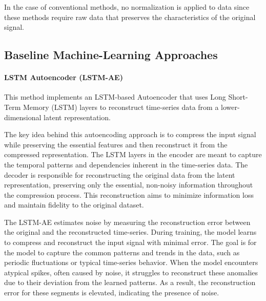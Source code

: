 \documentclass[conference]{IEEEtran}
\begin{document}


In the case of conventional methods, no normalization is applied to data since these methods require raw data that preserves the characteristics of the original signal.


\subsection{Baseline Machine-Learning Approaches}

\paragraph{LSTM Autoencoder (LSTM-AE)}
This method implements an LSTM-based Autoencoder that uses Long Short-Term Memory (LSTM) layers to reconstruct time-series data from a lower-dimensional latent representation. 

The key idea behind this autoencoding approach is to compress the input signal while preserving the essential features and then reconstruct it from the compressed representation. The LSTM layers in the encoder are meant to capture the temporal patterns and dependencies inherent in the time-series data. 
The decoder is responsible for reconstructing the original data from the latent representation, preserving only the essential, non-noisy information throughout the compression process. This reconstruction aims to minimize information loss and maintain fidelity to the original dataset. 

The LSTM-AE estimates noise by measuring the reconstruction error between the original and the reconstructed time-series. During training, the model learns to compress and reconstruct the input signal with minimal error. The goal is for the model to capture the common patterns and trends in the data, such as periodic fluctuations or typical time-series behavior. When the model encounters atypical spikes, often caused by noise, it struggles to reconstruct these anomalies due to their deviation from the learned patterns. As a result, the reconstruction error for these segments is elevated, indicating the presence of noise.
\end{document}
